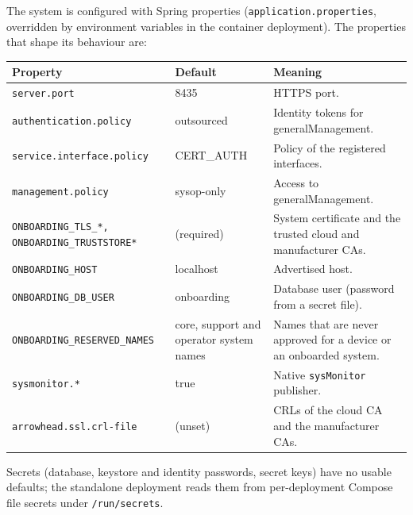 \documentclass[a4paper]{arrowhead}
\begin{document}
The system is configured with Spring properties (\texttt{application.properties}, overridden by environment variables in the container deployment). The properties that shape its behaviour are:

\noindent\begin{longtable}{| p{5.4cm} | p{3.4cm} | p{6.4cm} |} \hline
\rowcolor{gray!33} Property & Default & Meaning \\ \hline \endhead
\texttt{server.\allowbreak{}port} & 8435 & HTTPS port. \\ \hline
\texttt{authentication.\allowbreak{}policy} & outsourced & Identity tokens for generalManagement. \\ \hline
\texttt{service.\allowbreak{}interface.\allowbreak{}policy} & CERT\_AUTH & Policy of the registered interfaces. \\ \hline
\texttt{management.\allowbreak{}policy} & sysop-only & Access to generalManagement. \\ \hline
\texttt{ONBOARDING\_\allowbreak{}TLS\_\allowbreak{}*,\allowbreak{} ONBOARDING\_\allowbreak{}TRUSTSTORE*} & (required) & System certificate and the trusted cloud and manufacturer CAs. \\ \hline
\texttt{ONBOARDING\_\allowbreak{}HOST} & localhost & Advertised host. \\ \hline
\texttt{ONBOARDING\_\allowbreak{}DB\_\allowbreak{}USER} & onboarding & Database user (password from a secret file). \\ \hline
\texttt{ONBOARDING\_\allowbreak{}RESERVED\_\allowbreak{}NAMES} & core, support and operator system names & Names that are never approved for a device or an onboarded system. \\ \hline
\texttt{sysmonitor.\allowbreak{}*} & true & Native \texttt{sysMonitor} publisher. \\ \hline
\texttt{arrowhead.\allowbreak{}ssl.\allowbreak{}crl-\allowbreak{}file} & (unset) & CRLs of the cloud CA and the manufacturer CAs. \\ \hline
\end{longtable}

Secrets (database, keystore and identity passwords, secret keys) have no usable defaults; the standalone deployment reads them from per-deployment Compose file secrets under \texttt{/\allowbreak{}run/\allowbreak{}secrets}.
\end{document}
